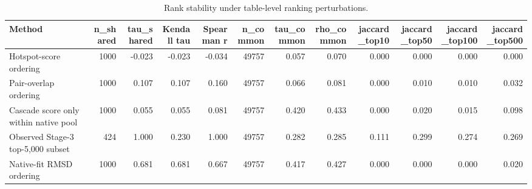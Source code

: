 \begin{table}[htbp]
\centering
\small
\caption{Rank stability under table-level ranking perturbations.}
\label{tab:ablation_results}
\begin{tabular}{lrrrrrrrrrrr}
\toprule
Method & n\_shared & tau\_shared & Kendall tau & Spearman r & n\_common & tau\_common & rho\_common & jaccard\_top10 & jaccard\_top50 & jaccard\_top100 & jaccard\_top500 \\
\midrule
Hotspot-score ordering & 1000 & -0.023 & -0.023 & -0.034 & 49757 & 0.057 & 0.070 & 0.000 & 0.000 & 0.000 & 0.000 \\
Pair-overlap ordering & 1000 & 0.107 & 0.107 & 0.160 & 49757 & 0.066 & 0.081 & 0.000 & 0.010 & 0.010 & 0.032 \\
Cascade score only within native pool & 1000 & 0.055 & 0.055 & 0.081 & 49757 & 0.420 & 0.433 & 0.000 & 0.020 & 0.015 & 0.098 \\
Observed Stage-3 top-5,000 subset & 424 & 1.000 & 0.230 & 1.000 & 49757 & 0.282 & 0.285 & 0.111 & 0.299 & 0.274 & 0.269 \\
Native-fit RMSD ordering & 1000 & 0.681 & 0.681 & 0.667 & 49757 & 0.417 & 0.427 & 0.000 & 0.000 & 0.000 & 0.020 \\
\bottomrule
\end{tabular}
\end{table}